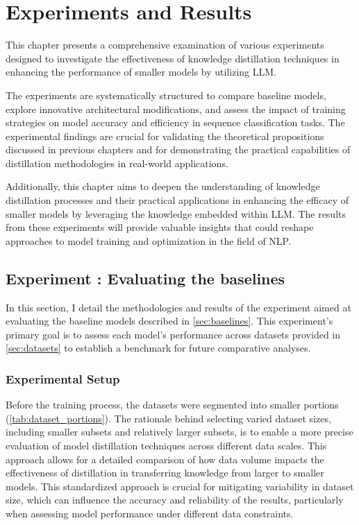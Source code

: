 \chapter{Experiments and Results}
\label{chap:impl}

This chapter presents a comprehensive examination of various experiments designed to investigate the effectiveness of knowledge distillation techniques in enhancing the performance of smaller models by utilizing LLM\@.

The experiments are systematically structured to compare baseline models, explore innovative architectural modifications, and assess the impact of training strategies on model accuracy and efficiency in sequence classification tasks. The experimental findings are crucial for validating the theoretical propositions discussed in previous chapters and for demonstrating the practical capabilities of distillation methodologies in real-world applications.

Additionally, this chapter aims to deepen the understanding of knowledge distillation processes and their practical applications in enhancing the efficacy of smaller models by leveraging the knowledge embedded within LLM\@. The results from these experiments will provide valuable insights that could reshape approaches to model training and optimization in the field of NLP\@.

\section{Experiment \theexperiment: Evaluating the baselines}

In this section, I detail the methodologies and results of the experiment aimed at evaluating the baseline models described in \autoref{sec:baselines}. This experiment's primary goal is to assess each model's performance across datasets provided in \autoref{sec:datasets} to establish a benchmark for future comparative analyses.

\subsection*{Experimental Setup}

Before the training process, the datasets were segmented into smaller portions (\autoref{tab:dataset_portions}). The rationale behind selecting varied dataset sizes, including smaller subsets and relatively larger subsets, is to enable a more precise evaluation of model distillation techniques across different data scales. This approach allows for a detailed comparison of how data volume impacts the effectiveness of distillation in transferring knowledge from larger to smaller models. This standardized approach is crucial for mitigating variability in dataset size, which can influence the accuracy and reliability of the results, particularly when assessing model performance under different data constraints.

